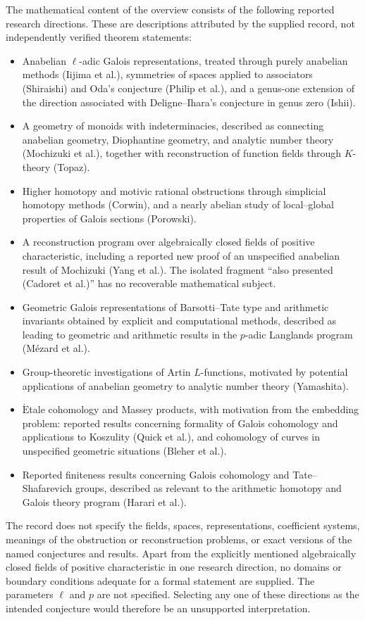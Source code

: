 \documentclass[11pt]{article}
\begin{document}
The mathematical content of the overview consists of the following reported research directions. These are descriptions attributed by the supplied record, not independently verified theorem statements:
\begin{itemize}
\item Anabelian $\ell$-adic Galois representations, treated through purely anabelian methods (Iijima et al.), symmetries of spaces applied to associators (Shiraishi) and Oda's conjecture (Philip et al.), and a genus-one extension of the direction associated with Deligne--Ihara's conjecture in genus zero (Ishii).
\item A geometry of monoids with indeterminacies, described as connecting anabelian geometry, Diophantine geometry, and analytic number theory (Mochizuki et al.), together with reconstruction of function fields through $K$-theory (Topaz).
\item Higher homotopy and motivic rational obstructions through simplicial homotopy methods (Corwin), and a nearly abelian study of local--global properties of Galois sections (Porowski).
\item A reconstruction program over algebraically closed fields of positive characteristic, including a reported new proof of an unspecified anabelian result of Mochizuki (Yang et al.). The isolated fragment ``also presented (Cadoret et al.)'' has no recoverable mathematical subject.
\item Geometric Galois representations of Barsotti--Tate type and arithmetic invariants obtained by explicit and computational methods, described as leading to geometric and arithmetic results in the $p$-adic Langlands program (M\'ezard et al.).
\item Group-theoretic investigations of Artin $L$-functions, motivated by potential applications of anabelian geometry to analytic number theory (Yamashita).
\item \(\acute{\mathrm{E}}\)tale cohomology and Massey products, with motivation from the embedding problem: reported results concerning formality of Galois cohomology and applications to Koszulity (Quick et al.), and cohomology of curves in unspecified geometric situations (Bleher et al.).
\item Reported finiteness results concerning Galois cohomology and Tate--Shafarevich groups, described as relevant to the arithmetic homotopy and Galois theory program (Harari et al.).
\end{itemize}
The record does not specify the fields, spaces, representations, coefficient systems, meanings of the obstruction or reconstruction problems, or exact versions of the named conjectures and results. Apart from the explicitly mentioned algebraically closed fields of positive characteristic in one research direction, no domains or boundary conditions adequate for a formal statement are supplied. The parameters $\ell$ and $p$ are not specified. Selecting any one of these directions as the intended conjecture would therefore be an unsupported interpretation.
\end{document}
